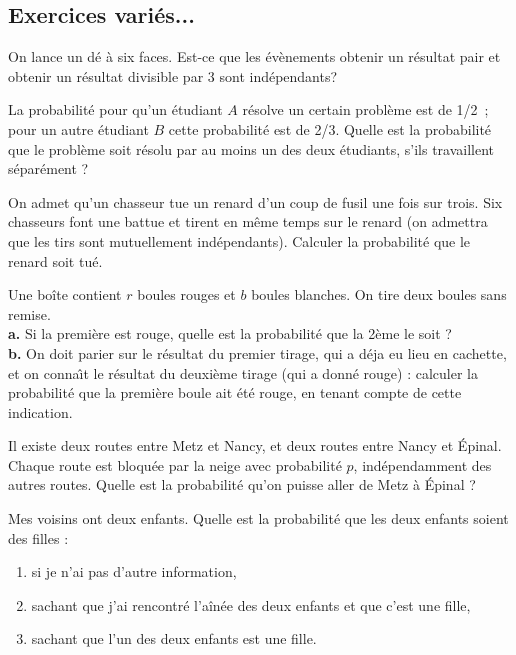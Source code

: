 \subsection*{Exercices variés...}

\begin{exo} On lance un dé à six faces. Est-ce que les évènements \og obtenir un
résultat pair\fg{}  et \og obtenir un résultat divisible par 3\fg{} sont
indépendants?
\end{exo}


\begin{exo} La probabilité pour qu'un étudiant $A$ résolve un certain problème est de 1/2~; pour un autre  étudiant $B$ cette probabilité est de 2/3. Quelle est la probabilité que le problème soit résolu par au moins un des deux  étudiants, s'ils travaillent séparément ?
\end{exo}


\begin{exo}
On admet qu'un chasseur tue un renard d'un coup de fusil une fois
sur trois. Six chasseurs font une battue et tirent en même temps sur le renard (on admettra que les
tirs sont mutuellement indépendants). Calculer la probabilité que le renard soit tué.
\end{exo}


\begin{exo}
Une boîte contient $r$ boules rouges et $b$ boules blanches. On tire deux boules sans remise. 
\\
\textbf{a.} Si la première est rouge, quelle est la probabilité que la 2ème le soit ? 
\\
\textbf{b.} On doit parier sur le r\'esultat du premier tirage, qui a d\'eja eu lieu en cachette, et on conna\^\i t le r\'esultat du deuxi\`eme tirage (qui a donn\'e rouge) : calculer la probabilit\'e que la premi\`ere boule ait  \'et\'e rouge, en tenant compte de cette indication.
\end{exo}


\begin{exo}
Il existe deux routes entre Metz et Nancy, et deux routes entre Nancy et Épinal. Chaque route est bloquée par la neige avec probabilité $p$, indépendamment des autres routes. Quelle est la probabilité qu'on puisse aller de Metz à Épinal ?
\end{exo}


\begin{exo} 
Mes voisins ont deux enfants. Quelle est la probabilité que les
deux enfants soient des filles :
\begin{enumerate}
\item  si je n'ai pas d'autre information,
\item  sachant que j'ai rencontré l'aînée des deux enfants et que
c'est une fille,
\item  sachant que l'un des deux enfants est une fille.
\end{enumerate}
\end{exo}


